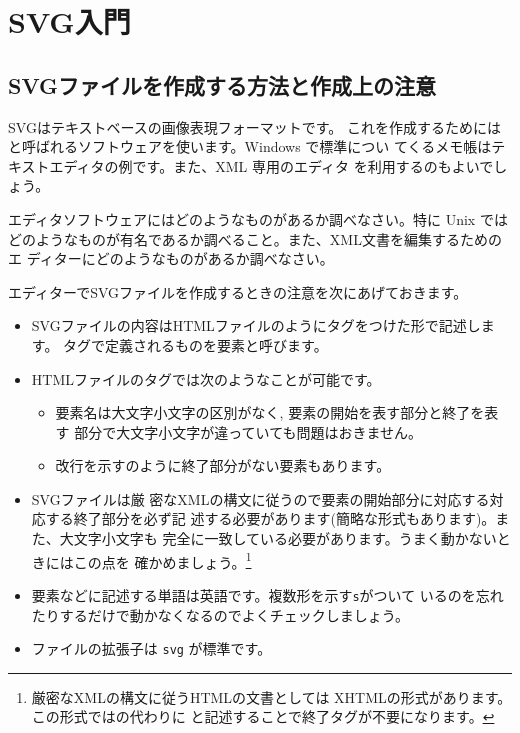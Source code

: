 \chapter{SVG入門}
\section{SVGファイルを作成する方法と作成上の注意}
SVGはテキストベースの画像表現フォーマットです。
これを作成するためには
と呼ばれるソフトウェアを使います。Windows で標準につい
てくるメモ帳はテキストエディタの例です。また、XML 専用のエディタ
を利用するのもよいでしょう。
\begin{Problem}
エディタソフトウェアにはどのようなものがあるか調べなさい。特に Unix では
 どのようなものが有名であるか調べること。また、XML文書を編集するためのエ
 ディターにどのようなものがあるか調べなさい。
\end{Problem}
エディターでSVGファイルを作成するときの注意を次にあげておきます。
\begin{itemize}
 \item SVGファイルの内容はHTMLファイルのようにタグをつけた形で記述します。
       タグで定義されるものを要素と呼びます。
 \item HTMLファイルのタグでは次のようなことが可能です。
\begin{itemize}
 \item 要素名は大文字小文字の区別がなく, 要素の開始を表す部分と終了を表す
       部分で大文字小文字が違っていても問題はおきません。
 \item 改行を示すのように終了部分がない要素もあります。
\end{itemize}
 \item SVGファイルは厳
       密なXMLの構文に従うので要素の開始部分に対応する対応する終了部分を必ず記
       述する必要があります(簡略な形式もあります)。また、大文字小文字も
       完全に一致している必要があります。うまく動かないときにはこの点を
       確かめましょう。\footnote{厳密なXMLの構文に従うHTMLの文書としては
       XHTMLの形式があります。この形式ではの代わりに
        と記述することで終了タグが不要になります。}
 \item 要素などに記述する単語は英語です。複数形を示す\texttt{s}がついて
       いるのを忘れたりするだけで動かなくなるのでよくチェックしましょう。
 \item ファイルの拡張子は \texttt{svg} が標準です。
\end{itemize}


